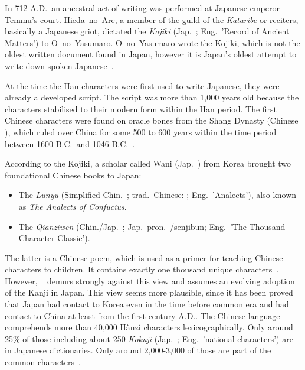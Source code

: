 In 712 A.D.\ an ancestral act of writing was performed at 
Japanese emperor Temmu's court. Hieda~no~Are, a member of the guild of the 
\emph{Kataribe} or reciters, basically a Japanese griot, dictated the 
\emph{Kojiki} (Jap.\ ; Eng.\ 'Record of Ancient Matters') to 
Ō~no~Yasumaro. Ō~no~Yasumaro wrote the Kojiki, which is not the oldest written 
document found in Japan, however it is Japan's oldest attempt to write down 
spoken Japanese~.

At the time the Han characters were first used to write Japanese, 
they were already a developed script. The script was more than 1,000 years old
because the characters stabilised to their modern form within the Han 
period. %
The first Chinese characters were found on oracle bones from the Shang Dynasty
(Chinese ), which ruled over China for some 500 to 600 years within 
the time period between 1600 B.C.\ and 1046 
B.C.~.

According to the Kojiki, a scholar called Wani (Jap.\ ) from Korea 
brought two foundational Chinese books to Japan: 
\begin{itemize}
  \item The \emph{Lunyu} 
        (Simplified Chin.\ ; 
        trad.\ Chinese: ; Eng.\ 'Analects'), 
        also known as \emph{The Analects of Confucius}.
  \item The \emph{Qianziwen} (Chin./Jap.\ ; Jap.\ 
        pron.\ /senjibun; 
        Eng.\ 'The Thousand Character Classic').
\end{itemize}
The latter is a Chinese poem, which is used as a primer for teaching Chinese characters to children. It contains exactly one thousand unique 
characters~\shortcite{Grassmuck1997}. However, 
~\citeyear{Lange1922} demurs strongly against this view 
and assumes an evolving adoption of the Kanji in
Japan. This view seems more plausible, since it has been proved that Japan 
had contact to Korea even in the time before common era and had contact to 
China at least from the first century A.D.. The Chinese language comprehends more
than 40,000 Hànzì characters lexicographically. Only around 25\% of those 
including about 250 \emph{Kokuji} (Jap.\ \cjk{国字}; Eng.\ 'national characters') 
are in Japanese dictionaries. Only around 2,000-3,000 of those are part of the 
common characters~\shortcite{Foljanty1984}. 

